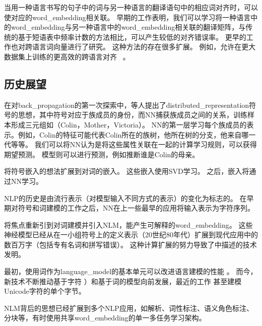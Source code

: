 
当用一种语言书写的句子中的词与另一种语言的翻译语句中的相应词对齐时，可以使对应的\gls{word_embedding}相关联。
早期的工作表明，我们可以学习将一种语言中的\gls{word_embedding}与另一种语言中的\gls{word_embedding}相关联的翻译矩阵\citep{Kocisky-et-al-ACL2014}，与传统的基于短语表中频率计数的方法相比，可以产生较低的对齐错误率。
更早的工作\citep{Klementiev-et-al-COLING2012}也对跨语言词向量进行了研究。 
这种方法的存在很多扩展。
例如，允许在更大数据集上训练的更高效的跨语言对齐~\citep{Gouws-et-al-arxiv2014} 。

\subsection{历史展望}
\label{sec:historical_perspective_chap12}

在对\gls{back_propagation}的第一次探索中，\citet{Rumelhart86b-small}等人提出了\gls{distributed_representation}符号的思想，其中符号对应于族成员的身份，而\gls{NN}捕获族成员之间的关系，训练样本形成三元组如（Colin，Mother，Victoria）。
\gls{NN}的第一层学习每个族成员的表示。例如，Colin的特征可能代表Colin所在的族树，他所在树的分支，他来自哪一代等等。
我们可以将\gls{NN}认为是将这些属性关联在一起的计算学习规则，可以获得期望预测。
模型则可以进行预测，例如推断谁是Colin的母亲。

\cite{Deerwester90}将符号嵌入的想法扩展到对词的嵌入。
这些嵌入使用SVD学习。 
之后，嵌入将通过\gls{NN}学习。

\gls{NLP}的历史是由流行表示（对模型输入不同方式的表示）的变化为标志的。
在早期对符号和词建模的工作之后，\gls{NN}在上一些最早的应用\citep{Miikkulainen91,Schmidhuber96}将输入表示为字符序列。

\citet{BenDucVin01-small} 将焦点重新引到对词建模并引入\gls{NLM}，能产生可解释的\gls{word_embedding}。
这些神经模型已经从在一小组符号上的定义表示（20世纪80年代）扩展到现代应用中的数百万字（包括专有名词和拼写错误）。
这种计算扩展的努力导致了中描述的技术发明。


最初，使用词作为\gls{language_model}的基本单元可以改进语言建模的性能 \citep{BenDucVin01-small}。
而今，新技术不断推动基于字符 \citep{Sutskever-et-al-ICML2011}）和基于词的模型向前发展，最近的工作 \citep{gillick2015multilingual}甚至建模Unicode字符的单个字节。

\gls{NLM}背后的思想已经扩展到多个\gls{NLP}应用，如解析\citep{Henderson-NAACL2003,Henderson-ACL2004,Collobert-AISTATS2011}、词性标注、语义角色标注、分块等，有时使用共享\gls{word_embedding}的单一多任务学习架构\citep{Collobert+Weston-ICML2008,collobert2011natural}。

